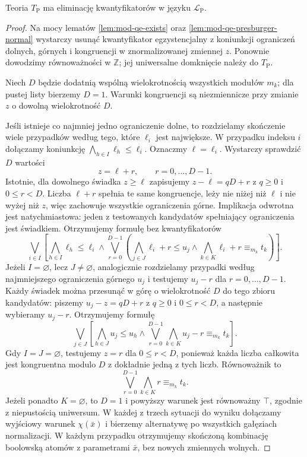 \begin{twierdzenie}
\label{thm:mod-qe-presburger}
Teoria $T_{\mathrm P}$ ma eliminację kwantyfikatorów
w języku $\mathcal L_{\mathrm P}$.
\end{twierdzenie}
\begin{proof}
Na mocy lematów \ref{lem:mod-qe-exists} oraz
\ref{lem:mod-qe-presburger-normal} wystarczy usunąć
kwantyfikator egzystencjalny z koniunkcji ograniczeń
dolnych, górnych i kongruencji w znormalizowanej zmiennej
$z$. Ponownie dowodzimy równoważności w $\mathbb Z$;
jej uniwersalne domknięcie należy do $T_{\mathrm P}$.

Niech $D$ będzie dodatnią wspólną wielokrotnością
wszystkich modułów $m_k$; dla pustej listy bierzemy
$D=1$. Warunki kongruencji są niezmiennicze
przy zmianie $z$ o dowolną wielokrotność $D$.

Jeśli istnieje co najmniej jedno ograniczenie dolne,
to rozdzielamy skończenie wiele przypadków według tego,
które $\ell_i$ jest największe. W przypadku indeksu
$i$ dołączamy koniunkcję
$\bigwedge_{h\in I}\ell_h\leq\ell_i$.
Oznaczmy $\ell=\ell_i$.
Wystarczy sprawdzić $D$ wartości
\[
z=\ell+r,\qquad r=0,\ldots,D-1.
\]
Istotnie, dla dowolnego świadka $z\geq\ell$
zapisujemy $z-\ell=qD+r$ z $q\geq0$ i
$0\leq r<D$. Liczba $\ell+r$ spełnia te same
kongruencje, leży nie niżej niż $\ell$ i nie wyżej
niż $z$, więc zachowuje wszystkie ograniczenia górne.
Implikacja odwrotna jest natychmiastowa: jeden
z testowanych kandydatów spełniający ograniczenia
jest świadkiem. Otrzymujemy formułę bez kwantyfikatorów
\[
\bigvee_{i\in I}
\left[
\bigwedge_{h\in I}\ell_h\leq\ell_i
\land
\bigvee_{r=0}^{D-1}
\left(
\bigwedge_{j\in J}\ell_i+r\leq u_j
\land
\bigwedge_{k\in K}\ell_i+r\equiv_{m_k}t_k
\right)
\right].
\]
Jeżeli $I=\varnothing$, lecz $J\ne\varnothing$,
analogicznie rozdzielamy przypadki według najmniejszego
ograniczenia górnego $u_j$ i testujemy $u_j-r$ dla
$r=0,\ldots,D-1$. Każdy świadek można przesunąć
w górę o wielokrotność $D$ do tego zbioru kandydatów:
piszemy $u_j-z=qD+r$ z $q\geq0$ i $0\leq r<D$,
a następnie wybieramy $u_j-r$. Otrzymujemy formułę
\[
\bigvee_{j\in J}
\left[
\bigwedge_{h\in J}u_j\leq u_h
\land
\bigvee_{r=0}^{D-1}
\bigwedge_{k\in K}u_j-r\equiv_{m_k}t_k
\right].
\]
Gdy $I=J=\varnothing$, testujemy $z=r$ dla
$0\leq r<D$, ponieważ każda liczba całkowita jest
kongruentna modulo $D$ z dokładnie jedną z tych liczb.
Równoważnik to
\[
\bigvee_{r=0}^{D-1}\bigwedge_{k\in K}
 r\equiv_{m_k}t_k.
\]
Jeżeli ponadto $K=\varnothing$, to $D=1$ i powyższy
warunek jest równoważny $\top$, zgodnie z niepustością
uniwersum. W każdej z trzech sytuacji do wyniku
dołączamy wyjściowy warunek $\chi(\bar x)$ i bierzemy
alternatywę po wszystkich gałęziach normalizacji. W każdym przypadku otrzymujemy
skończoną kombinację boolowską atomów z parametrami
$\bar x$, bez nowych zmiennych wolnych.
\end{proof}

